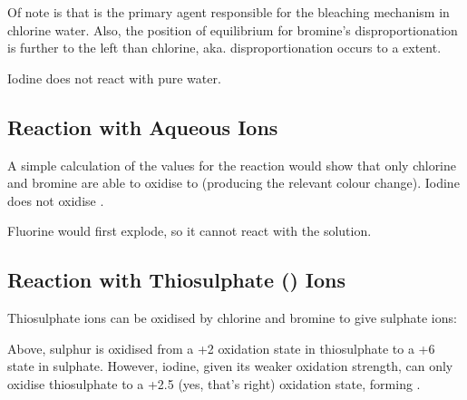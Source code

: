 			Of note is that  is the primary agent responsible for the bleaching mechanism in chlorine water. Also, the position
			of equilibrium for bromine's disproportionation is further to the left than chlorine, aka. disproportionation occurs to
			a  extent.


			Iodine does not react with pure water.



		\subsection{Reaction with Aqueous  Ions}

			A simple calculation of the \Ecell{} values for the reaction would show that only chlorine and bromine are able to oxidise
			 to  (producing the relevant colour change). Iodine does not oxidise .

			Fluorine would first explode, so it cannot react with the  solution.





		\pagebreak
		\subsection{Reaction with Thiosulphate () Ions}

			Thiosulphate ions can be oxidised by chlorine and bromine to give sulphate ions:


			Above, sulphur is oxidised from a +2 oxidation state in thiosulphate to a +6 state in sulphate. However, iodine, given its weaker
			oxidation strength, can only oxidise thiosulphate to a +2.5 (yes, that's right) oxidation state, forming .





